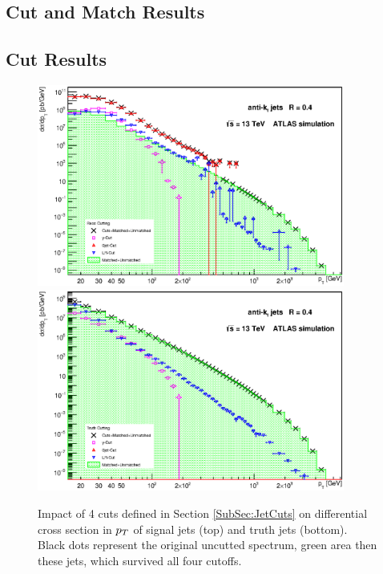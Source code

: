 \begin{appendices}

\chapter{Cut and Match Results}
\label{App:CutAndMatchingResults}

\newpage 

\section{Cut Results}
\label{sec:CutResults}

\begin{figure}[H]
  \centering
  \includegraphics[width=0.9\textwidth]{Chapter3/SignalCutting.eps}
  \includegraphics[width=0.9\textwidth]{Chapter3/TruthCutting.eps}
  \caption{Impact of 4 cuts defined in Section \ref{SubSec:JetCuts} on
  differential cross section in $p_{T}$ of signal jets (top) and truth jets
  (bottom). Black dots represent the original uncutted spectrum, green area then
  these jets, which survived all four cutoffs.}
  \label{fig:Cutting}
\end{figure}


\end{appendices}
